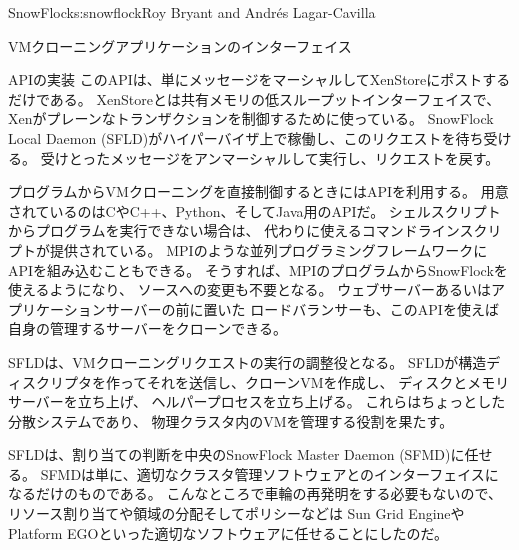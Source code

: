 \begin{aosachapter}{SnowFlock}{s:snowflock}{Roy Bryant and Andr\'e{s} Lagar-Cavilla}
\begin{aosasect1}{VMクローニングアプリケーションのインターフェイス}
\begin{aosasect2}{APIの実装}
このAPIは、単にメッセージをマーシャルしてXenStoreにポストするだけである。
XenStoreとは共有メモリの低スループットインターフェイスで、Xenがプレーンなトランザクションを制御するために使っている。
SnowFlock Local Daemon (SFLD)がハイパーバイザ上で稼働し、このリクエストを待ち受ける。
受けとったメッセージをアンマーシャルして実行し、リクエストを戻す。

プログラムからVMクローニングを直接制御するときにはAPIを利用する。
用意されているのはCやC++、Python、そしてJava用のAPIだ。
シェルスクリプトからプログラムを実行できない場合は、
代わりに使えるコマンドラインスクリプトが提供されている。
MPIのような並列プログラミングフレームワークにAPIを組み込むこともできる。
そうすれば、MPIのプログラムからSnowFlockを使えるようになり、
ソースへの変更も不要となる。
ウェブサーバーあるいはアプリケーションサーバーの前に置いた
ロードバランサーも、このAPIを使えば自身の管理するサーバーをクローンできる。

SFLDは、VMクローニングリクエストの実行の調整役となる。
SFLDが構造ディスクリプタを作ってそれを送信し、クローンVMを作成し、
ディスクとメモリサーバーを立ち上げ、
ヘルパープロセスを立ち上げる。
これらはちょっとした分散システムであり、
物理クラスタ内のVMを管理する役割を果たす。

SFLDは、割り当ての判断を中央のSnowFlock Master Daemon (SFMD)に任せる。
SFMDは単に、適切なクラスタ管理ソフトウェアとのインターフェイスになるだけのものである。
こんなところで車輪の再発明をする必要もないので、リソース割り当てや領域の分配そしてポリシーなどは
Sun Grid EngineやPlatform EGOといった適切なソフトウェアに任せることにしたのだ。


\end{aosasect2}
\end{aosasect1}
\end{aosachapter}
